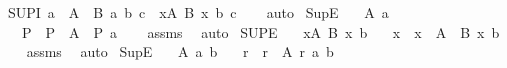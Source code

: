 \begin{isabellebody}
\isamarkupfalse%
\ SUP{}{\isacharunderscore}{\kern0pt}I{\isacharcolon}{\kern0pt}\ {\isachardoublequoteopen}a\ {\isasymin}\ A\ {\isasymLongrightarrow}\ B\ a\ b\ c\ {\isasymLongrightarrow}\ {\isacharparenleft}{\kern0pt}{\isasymSqunion}x{\isasymin}A{\isachardot}{\kern0pt}\ B\ x{\isacharparenright}{\kern0pt}\ b\ c{\isachardoublequoteclose}\isanewline
%
\isadelimproof
\ \ %
\endisadelimproof
%
\isatagproof
{}\isamarkupfalse%
\ auto%
\endisatagproof
{\isafoldproof}%
%
\isadelimproof
\isanewline
%
\endisadelimproof
\isanewline
{}\isamarkupfalse%
\ Sup{}{\isacharunderscore}{\kern0pt}E{\isacharcolon}{\kern0pt}\isanewline
\ \ \ {\isachardoublequoteopen}{\isacharparenleft}{\kern0pt}{\isasymSqunion}A{\isacharparenright}{\kern0pt}\ a{\isachardoublequoteclose}\isanewline
\ \ \ P\ \ {\isachardoublequoteopen}P\ {\isasymin}\ A{\isachardoublequoteclose}\ \ {\isachardoublequoteopen}P\ a{\isachardoublequoteclose}\isanewline
%
\isadelimproof
\ \ %
\endisadelimproof
%
\isatagproof
{}\isamarkupfalse%
\ assms\ \isamarkupfalse%
\ auto%
\endisatagproof
{\isafoldproof}%
%
\isadelimproof
\isanewline
%
\endisadelimproof
\isanewline
{}\isamarkupfalse%
\ SUP{}{\isacharunderscore}{\kern0pt}E{\isacharcolon}{\kern0pt}\isanewline
\ \ \ {\isachardoublequoteopen}{\isacharparenleft}{\kern0pt}{\isasymSqunion}x{\isasymin}A{\isachardot}{\kern0pt}\ B\ x{\isacharparenright}{\kern0pt}\ b{\isachardoublequoteclose}\isanewline
\ \ \ x\ \ {\isachardoublequoteopen}x\ {\isasymin}\ A{\isachardoublequoteclose}\ \ {\isachardoublequoteopen}B\ x\ b{\isachardoublequoteclose}\isanewline
%
\isadelimproof
\ \ %
\endisadelimproof
%
\isatagproof
{}\isamarkupfalse%
\ assms\ \isamarkupfalse%
\ auto%
\endisatagproof
{\isafoldproof}%
%
\isadelimproof
\isanewline
%
\endisadelimproof
\isanewline
{}\isamarkupfalse%
\ Sup{}{\isacharunderscore}{\kern0pt}E{\isacharcolon}{\kern0pt}\isanewline
\ \ \ {\isachardoublequoteopen}{\isacharparenleft}{\kern0pt}{\isasymSqunion}A{\isacharparenright}{\kern0pt}\ a\ b{\isachardoublequoteclose}\isanewline
\ \ \ r\ \ {\isachardoublequoteopen}r\ {\isasymin}\ A{\isachardoublequoteclose}\ {\isachardoublequoteopen}r\ a\ b{\isachardoublequoteclose}\isanewline
%
\isadelimproof
\ \ %
\endisadelimproof
%
\isatagproof

\end{isabellebody}
